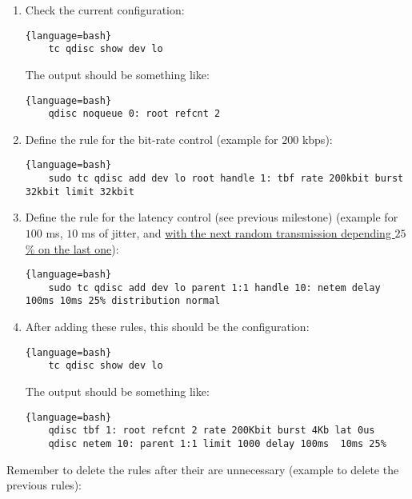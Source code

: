 \begin{enumerate}
\item Check the current configuration:
  
  \begin{lstlisting}{language=bash}
    tc qdisc show dev lo
  \end{lstlisting}
  
  The output should be something like:
  
  \begin{lstlisting}{language=bash}
    qdisc noqueue 0: root refcnt 2
  \end{lstlisting}
  
\item Define the rule for the bit-rate control (example for $200$ kbps):
  
  \begin{lstlisting}{language=bash}
    sudo tc qdisc add dev lo root handle 1: tbf rate 200kbit burst 32kbit limit 32kbit
  \end{lstlisting}
  
\item Define the rule for the latency control (see previous milestone)
  (example for $100$ ms, $10$ ms of jitter, and
  \href{https://wiki.linuxfoundation.org/networking/netem}{with the
    next random transmission depending $25$\% on the last one}):
  
  \begin{lstlisting}{language=bash}
    sudo tc qdisc add dev lo parent 1:1 handle 10: netem delay 100ms 10ms 25% distribution normal
  \end{lstlisting}
  
\item After adding these rules, this should be the configuration:
  
  \begin{lstlisting}{language=bash}
    tc qdisc show dev lo
  \end{lstlisting}
  
  The output should be something like:
  
  \begin{lstlisting}{language=bash}
    qdisc tbf 1: root refcnt 2 rate 200Kbit burst 4Kb lat 0us 
    qdisc netem 10: parent 1:1 limit 1000 delay 100ms  10ms 25%
  \end{lstlisting}

\end{enumerate}

Remember to delete the rules after their are unnecessary (example to delete the previous rules):

